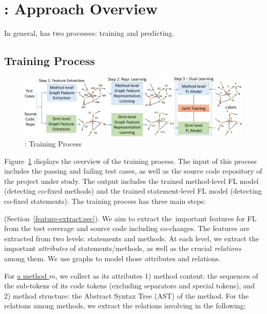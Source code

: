 \section{{\tool}: Approach Overview}
\label{overview:sec}


In general, {\tool} has two processes: training and predicting.

\subsection{Training Process}

\begin{figure}[t]
	\centering
	\includegraphics[width=5.5in]{graphs/overview-training.png}
        \vspace{-8pt}
	\caption{{\tool}: Training Process}
        \label{train-overview}
\end{figure}

Figure~\ref{train-overview} displays the overview of the training
process. The input of this process includes the passing and failing
test cases, as well as the source code repository of the project under
study. The output includes the trained method-level
FL model (detecting co-fixed methods) and the trained statement-level
FL model (detecting co-fixed statements). The training process has
three main steps:

\vspace{3pt}
(Section~\ref{feature-extract:sec}). We aim to extract the~important
features for FL from the test coverage and source code including
co-changes. The features are extracted from two levels: statements and
methods. At each level, we extract the important {\em attributes} of
statements/methods, as well as the crucial {\em relations} among
them. We use graphs to model those attributes and relations.


For \underline{a method $m$}, we collect as its attributes 1) method
content: the sequences of the sub-tokens of its code tokens (excluding
separators and special tokens), and 2) method structure: the Abstract
Syntax Tree (AST) of the method. For the relations among methods, we
extract the relations involving in the following:

